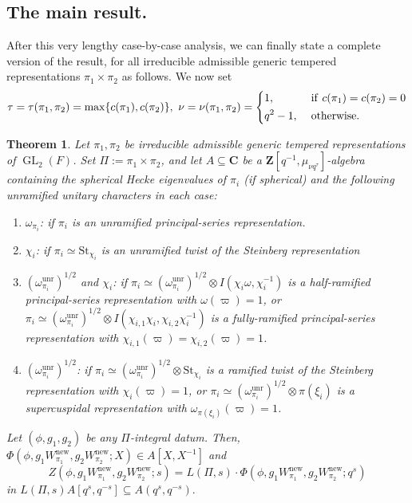 \documentclass{amsart}
\theoremstyle{plain}
\newtheorem{thm}{Theorem}[subsection]
\theoremstyle{plain}
\theoremstyle{remark}
\DeclareMathOperator{\GL}{GL}
\begin{document}
\subsection{The main result.}
After this very lengthy case-by-case analysis, we can finally state a complete version of the result, for all irreducible admissible generic tempered representations $\pi_1\times\pi_2$ as follows. We now set 
$$\tau=\tau(\pi_1,\pi_2)=\max\{c(\pi_1),c(\pi_2)\},\ \nu=\nu(\pi_1,\pi_2)=\begin{dcases}
    1,\ &\mathrm{if}\ c(\pi_1)=c(\pi_2)=0\\
    q^2-1,\ &\mathrm{otherwise.}
\end{dcases}$$
\begin{thm}\label{thm: main theorem}
    Let $\pi_1,\pi_2$ be irreducible admissible generic tempered representations of $\GL_2(F)$. Set $\Pi:=\pi_1\times\pi_2$, and let $A\subseteq\mathbf{C}$ be a $\mathbf{Z}[q^{-1},\mu_{\nu q^\tau}]$-algebra containing the spherical Hecke eigenvalues of $\pi_i$ \emph{(}if spherical\emph{)} and the following unramified unitary characters in each case: 
    \begin{enumerate}
        \item $\omega_{\pi_i}$\emph{:} if $\pi_i$ is an unramified principal-series representation.
        \item $\chi_i$\emph{:} if $\pi_i\simeq\mathrm{St}_{\chi_i}$ is an unramified twist of the Steinberg representation
        \item $(\omega_{\pi_i}^\mathrm{unr})^{1/2}$ and $\chi_i$\emph{:} if $\pi_i\simeq (\omega_{\pi_i}^\mathrm{unr})^{1/2}\otimes I(\chi_i\omega,\chi_i^{-1})$ is a half-ramified principal-series representation with $\omega(\varpi)=1$, or $\pi_i\simeq (\omega_{\pi_i}^\mathrm{unr})^{1/2}\otimes I(\chi_{i,1}\chi_i,\chi_{i,2}\chi_i^{-1})$ is a fully-ramified principal-series representation with $\chi_{i,1}(\varpi)=\chi_{i,2}(\varpi)=1$.
        \item $(\omega_{\pi_i}^\mathrm{unr})^{1/2}$\emph{:} if $\pi_i\simeq (\omega_{\pi_i}^\mathrm{unr})^{1/2}\otimes \mathrm{St}_{\chi_i}$ is a ramified twist of the Steinberg representation with $\chi_i(\varpi)=1$, or $\pi_i\simeq (\omega_{\pi_i}^\mathrm{unr})^{1/2}\otimes \pi(\xi_i)$ is a supercuspidal representation with $\omega_{\pi(\xi_i)}(\varpi)=1$.
    \end{enumerate}
    Let $(\phi,g_1,g_2)$ be any $\Pi$-integral datum. Then,  $\Phi(\phi,g_1W_{\pi_1}^\mathrm{new},g_2W_{\pi_2}^\mathrm{new};X)\in A[X,X^{-1}]$ and
    $$Z(\phi,g_1W_{\pi_1}^\mathrm{new},g_2W_{\pi_2}^\mathrm{new};s)=L(\Pi,s)\cdot \Phi(\phi,g_1W_{\pi_1}^\mathrm{new},g_2W_{\pi_2}^\mathrm{new};q^s)$$
    in $L(\Pi,s)A[q^s,q^{-s}]\subseteq A(q^s,q^{-s}).$
\end{thm}
\end{document}
